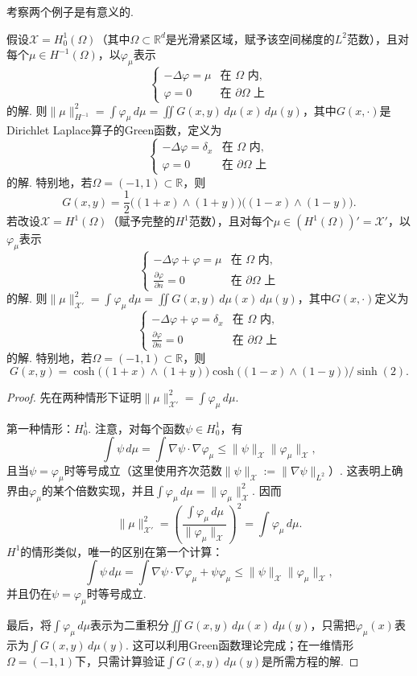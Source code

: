 考察两个例子是有意义的.
\begin{proposition}\label{obj:7.6}
假设$\mathscr X=H_0^1(\Omega)$（其中$\Omega\subset\mathbb R^d$是光滑紧区域，赋予该空间梯度的$L^2$范数），且对每个$\mu\in H^{-1}(\Omega)$，以$\varphi_\mu$表示
\[
 \begin{cases}-\Delta\varphi=\mu&\text{在 }\Omega\text{ 内},\\
 \varphi=0&\text{在 }\partial\Omega\text{ 上}\end{cases}
\]
的解. 则$\|\mu\|_{H^{-1}}^2=\int\varphi_\mu\,d\mu=\iint G(x,y)\,d\mu(x)\,d\mu(y)$，其中$G(x,\cdot)$是Dirichlet Laplace算子的Green函数，定义为
\[
 \begin{cases}-\Delta\varphi=\delta_x&\text{在 }\Omega\text{ 内},\\
 \varphi=0&\text{在 }\partial\Omega\text{ 上}\end{cases}
\]
的解. 特别地，若$\Omega=(-1,1)\subset\mathbb R$，则
\[
 G(x,y)=\frac12\bigl((1+x)\wedge(1+y)\bigr)
                         \bigl((1-x)\wedge(1-y)\bigr).
\]
若改设$\mathscr X=H^1(\Omega)$（赋予完整的$H^1$范数），且对每个$\mu\in(H^1(\Omega))'=\mathscr X'$，以$\varphi_\mu$表示
\[
 \begin{cases}-\Delta\varphi+\varphi=\mu&\text{在 }\Omega\text{ 内},\\
 \displaystyle\frac{\partial\varphi}{\partial n}=0&\text{在 }\partial\Omega\text{ 上}\end{cases}
\]
的解. 则$\|\mu\|_{\mathscr X'}^2=\int\varphi_\mu\,d\mu=\iint G(x,y)\,d\mu(x)\,d\mu(y)$，其中$G(x,\cdot)$定义为
\[
 \begin{cases}-\Delta\varphi+\varphi=\delta_x&\text{在 }\Omega\text{ 内},\\
 \displaystyle\frac{\partial\varphi}{\partial n}=0&\text{在 }\partial\Omega\text{ 上}\end{cases}
\]
的解. 特别地，若$\Omega=(-1,1)\subset\mathbb R$，则
\[
 G(x,y)=\cosh\bigl((1+x)\wedge(1+y)\bigr)
       \cosh\bigl((1-x)\wedge(1-y)\bigr)/\sinh(2).
\]
\end{proposition}
\begin{proof}
先在两种情形下证明$\|\mu\|_{\mathscr X'}^2=\int\varphi_\mu\,d\mu$.

第一种情形：$H_0^1$. 注意，对每个函数$\psi\in H_0^1$，有
\[
 \int\psi\,d\mu=\int\nabla\psi\cdot\nabla\varphi_\mu
             \leq\|\psi\|_{\mathscr X}\|\varphi_\mu\|_{\mathscr X},
\]
且当$\psi=\varphi_\mu$时等号成立（这里使用齐次范数$\|\psi\|_{\mathscr X}:=\|\nabla\psi\|_{L^2}$）. 这表明上确界由$\varphi_\mu$的某个倍数实现，并且$\int\varphi_\mu\,d\mu=\|\varphi_\mu\|_{\mathscr X}^2$. 因而
\[
 \|\mu\|_{\mathscr X'}^2=
 \left(\frac{\int\varphi_\mu\,d\mu}{\|\varphi_\mu\|_{\mathscr X}}\right)^2
 =\int\varphi_\mu\,d\mu.
\]
$H^1$的情形类似，唯一的区别在第一个计算：
\[
 \int\psi\,d\mu=\int\nabla\psi\cdot\nabla\varphi_\mu+\psi\varphi_\mu
             \leq\|\psi\|_{\mathscr X}\|\varphi_\mu\|_{\mathscr X},
\]
并且仍在$\psi=\varphi_\mu$时等号成立.

最后，将$\int\varphi_\mu\,d\mu$表示为二重积分$\iint G(x,y)\,d\mu(x)\,d\mu(y)$，只需把$\varphi_\mu(x)$表示为$\int G(x,y)\,d\mu(y)$. 这可以利用Green函数理论完成；在一维情形$\Omega=(-1,1)$下，只需计算验证$\int G(x,y)\,d\mu(y)$是所需方程的解.
\end{proof}
